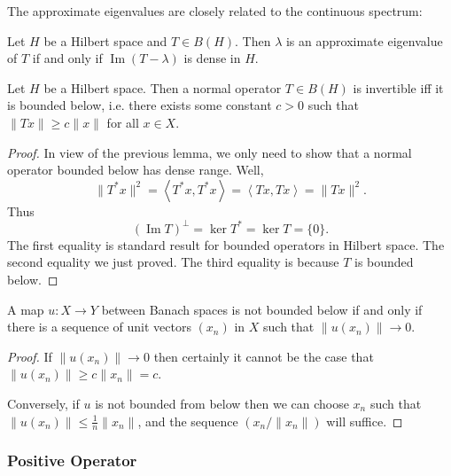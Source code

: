 The approximate eigenvalues are closely related to the continuous spectrum:
\begin{proposition}
	\label{prop:ApproxEigenDense}
	Let $H$ be a Hilbert space and $T \in B(H)$. Then $\lambda$ is an approximate eigenvalue of $T$ if and only if $\operatorname{Im} (T - \lambda)$ is dense in $H$.
\end{proposition}









\begin{lemma}
	\label{lem:BoundedBelowNormal}
	Let $H$ be a Hilbert space. Then a normal operator $T \in B(H)$ is invertible iff it is bounded below, i.e. there exists some constant $c>0$ such that $\|T x\| \ge c \|x\|$ for all $x \in X$.
\end{lemma}
\begin{proof}
	In view of the previous lemma, we only need to show that a normal operator bounded below has dense range. Well,
	\[
		\|T^* x\|^2 = \left\langle T^* x, T^*x \right\rangle 
		= \left\langle Tx, Tx \right\rangle 
		= \|T x\|^2
	.\] 
	Thus
	\[
		\left( \operatorname{Im} T \right) ^\perp
		= \operatorname{ker} T^*
		= \operatorname{ker} T
		= \{0\} 
	.\] 
	The first equality is standard result for bounded operators in Hilbert space. The second equality we just proved. The third equality is because $T$ is bounded below.
\end{proof}


\begin{lemma}
	\label{lem:BoundedBelowSequence}
	A map $u: X \to Y$ between Banach spaces is not bounded below if and only if there is a sequence of unit vectors $(x_n)$ in $X$ such that $\|u(x_n)\|\to 0$.
\end{lemma}
\begin{proof}
	If $\|u(x_n)\|\to 0$ then certainly it cannot be the case that $\|u(x_n)\| \ge c \|x_n\| = c$.

	Conversely, if  $u$ is not bounded from below then we can choose $x_n$ such that $\|u (x_n)\| \le \frac{1}{n} \|x_n\|$, and the sequence $\left( x_n / \|x_n\| \right) $ will suffice.
\end{proof}


\subsubsection{Positive Operator}

